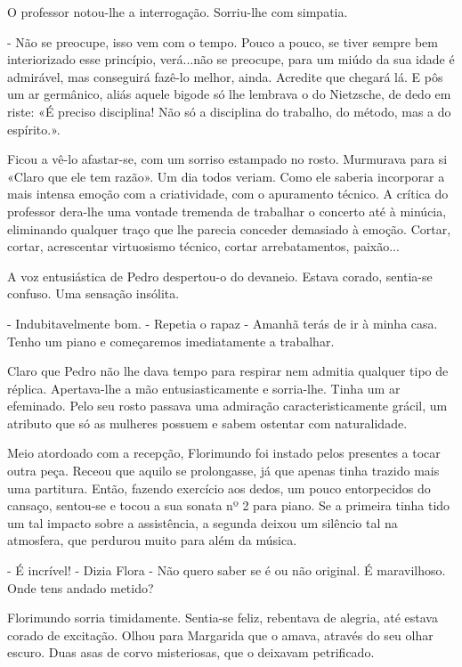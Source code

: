 O professor notou-lhe a interrogação. Sorriu-lhe com simpatia.

- Não se preocupe, isso vem com o tempo. Pouco a pouco, se tiver sempre
bem interiorizado esse princípio, verá...não se preocupe, para um miúdo
da sua idade é admirável, mas conseguirá fazê-lo melhor, ainda. Acredite
que chegará lá. E pôs um ar germânico, aliás aquele bigode só lhe
lembrava o do Nietzsche, de dedo em riste: «É preciso disciplina! Não só
a disciplina do trabalho, do método, mas a do espírito.».

Ficou a vê-lo afastar-se, com um sorriso estampado no rosto. Murmurava
para si «Claro que ele tem razão». Um dia todos veriam. Como ele saberia
incorporar a mais intensa emoção com a criatividade, com o apuramento
técnico. A crítica do professor dera-lhe uma vontade tremenda de
trabalhar o concerto até à minúcia, eliminando qualquer traço que lhe
parecia conceder demasiado à emoção. Cortar, cortar, acrescentar
virtuosismo técnico, cortar arrebatamentos, paixão...

A voz entusiástica de Pedro despertou-o do devaneio. Estava corado,
sentia-se confuso. Uma sensação insólita.

- Indubitavelmente bom. - Repetia o rapaz - Amanhã terás de ir à minha
casa. Tenho um piano e começaremos imediatamente a trabalhar.

Claro que Pedro não lhe dava tempo para respirar nem admitia qualquer
tipo de réplica. Apertava-lhe a mão entusiasticamente e sorria-lhe.
Tinha um ar efeminado. Pelo seu rosto passava uma admiração
caracteristicamente grácil, um atributo que só as mulheres possuem e
sabem ostentar com naturalidade.

Meio atordoado com a recepção, Florimundo foi instado pelos presentes a
tocar outra peça. Receou que aquilo se prolongasse, já que apenas tinha
trazido mais uma partitura. Então, fazendo exercício aos dedos, um pouco
entorpecidos do cansaço, sentou-se e tocou a sua sonata nº 2 para piano.
Se a primeira tinha tido um tal impacto sobre a assistência, a segunda
deixou um silêncio tal na atmosfera, que perdurou muito para além da
música.

- É incrível! - Dizia Flora - Não quero saber se é ou não original. É
maravilhoso. Onde tens andado metido?

Florimundo sorria timidamente. Sentia-se feliz, rebentava de alegria,
até estava corado de excitação. Olhou para Margarida que o amava,
através do seu olhar escuro. Duas asas de corvo misteriosas, que o
deixavam petrificado.

